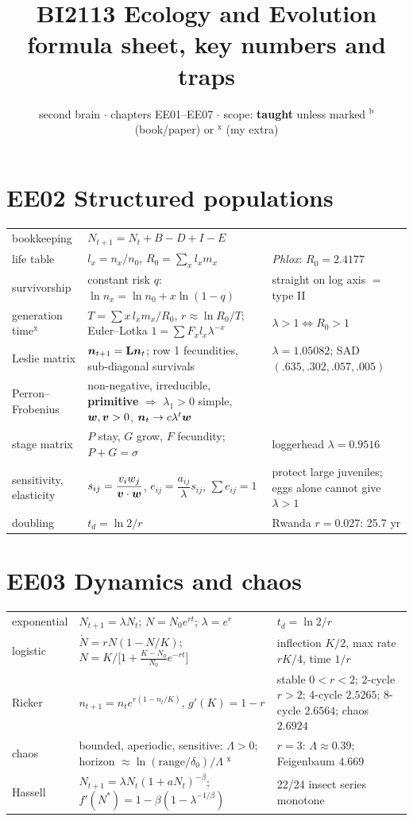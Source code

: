 \documentclass[9pt]{article}
\title{BI2113 Ecology and Evolution\\\large formula sheet, key numbers and traps}
\author{second brain $\cdot$ chapters EE01--EE07 $\cdot$ scope: \textbf{taught} unless marked $^{\text{b}}$ (book/paper) or $^{\text{x}}$ (my extra)}
\date{}
\begin{document}
\maketitle
\vspace{-2.2em}

\section*{EE02 Structured populations}
\begin{tabular}{@{}p{2.6cm}p{8.2cm}p{6.6cm}@{}}
\toprule
bookkeeping & $N_{t+1}=N_t+B-D+I-E$ & \\
life table & $l_x=n_x/n_0$, \quad $R_0=\sum_x l_xm_x$ & \emph{Phlox}: $R_0=2.4177$\\
survivorship & constant risk $q$: $\ln n_x=\ln n_0+x\ln(1-q)$ & straight on log axis $=$ type II\\
generation time$^{\text{x}}$ & $T=\sum x\,l_xm_x/R_0$, \quad $r\approx\ln R_0/T$; Euler--Lotka $1=\sum F_xl_x\lambda^{-x}$ & $\lambda>1\iff R_0>1$\\
Leslie matrix & $\bm{n}_{t+1}=\mathbf L\bm{n}_t$; row 1 fecundities, sub-diagonal survivals & $\lambda=1.05082$; SAD $(.635,.302,.057,.005)$\\
Perron--Frobenius & non-negative, irreducible, \textbf{primitive} $\Rightarrow$ $\lambda_1>0$ simple, $\bm{w},\bm{v}>0$, $\bm{n}_t\to c\lambda^t\bm{w}$ & \\
stage matrix & $P$ stay, $G$ grow, $F$ fecundity; $P+G=\sigma$ & loggerhead $\lambda=0.9516$\\
sensitivity, elasticity & $s_{ij}=\dfrac{v_iw_j}{\bm{v}\cdot\bm{w}}$, \quad $e_{ij}=\dfrac{a_{ij}}{\lambda}s_{ij}$, \quad $\sum e_{ij}=1$ & protect large juveniles; eggs alone cannot give $\lambda>1$\\
doubling & $t_d=\ln 2/r$ & Rwanda $r=0.027$: 25.7 yr\\
\bottomrule
\end{tabular}

\section*{EE03 Dynamics and chaos}
\begin{tabular}{@{}p{2.6cm}p{8.2cm}p{6.6cm}@{}}
\toprule
exponential & $N_{t+1}=\lambda N_t$; \quad $N=N_0e^{rt}$; \quad $\lambda=e^r$ & $t_d=\ln2/r$\\
logistic & $\dot N=rN(1-N/K)$; \quad $N=K\big/\big[1+\tfrac{K-N_0}{N_0}e^{-rt}\big]$ & inflection $K/2$, max rate $rK/4$, time $1/r$\\
Ricker & $n_{t+1}=n_te^{r(1-n_t/K)}$, \quad $g'(K)=1-r$ & stable $0<r<2$; 2-cycle $r>2$; 4-cycle $2.5265$; 8-cycle $2.6564$; chaos $2.6924$\\
chaos & bounded, aperiodic, sensitive: $\Lambda>0$; horizon $\approx\ln(\text{range}/\delta_0)/\Lambda$ $^{\text{x}}$ & $r=3$: $\Lambda\approx0.39$; Feigenbaum $4.669$\\
Hassell & $N_{t+1}=\lambda N_t(1+aN_t)^{-\beta}$; \quad $f'(N^*)=1-\beta(1-\lambda^{-1/\beta})$ & 22/24 insect series monotone\\
\bottomrule
\end{tabular}
\end{document}
